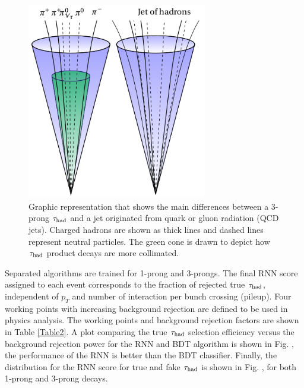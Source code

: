 \begin{figure}[h]
	\centering
	\includegraphics[width=0.7\textwidth]{figures/Fig4}
	\caption{Graphic representation that shows the main differences between a 3-prong $\tau_\text{had}$ and a jet originated from quark or gluon radiation (QCD jets). Charged hadrons are shown as thick lines and dashed lines represent neutral particles. The green cone is drawn to depict how $\tau_\text{had}$ product decays are more collimated.}
	\label{Fig4}
\end{figure}
Separated algorithms are trained for 1-prong and 3-prongs. The final RNN score assigned to each event corresponds to the fraction of rejected true $\tau_\text{had}$, independent of $p_T$ and number of interaction per bunch crossing (pileup). Four working points with increasing background rejection are defined to be used in physics analysis. The working points and background rejection factors are shown in Table \ref{Table2}. A plot comparing the true $\tau_\text{had}$ selection efficiency versus the background rejection power for the RNN and BDT algorithm is shown in Fig. , the performance of the RNN is better than the BDT classifier. Finally, the distribution for the RNN score for true and fake $\tau_\text{had}$ is shown in Fig. , for both 1-prong and 3-prong decays.
